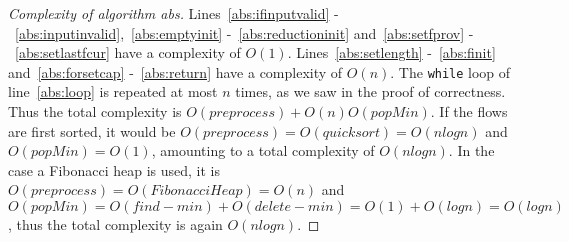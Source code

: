 \begin{proof}[Complexity of algorithm abs]
  Lines~\ref{abs:ifinputvalid} -~\ref{abs:inputinvalid},~\ref{abs:emptyinit} -~\ref{abs:reductioninit} and~\ref{abs:setfprov}
  -~\ref{abs:setlastfcur} have a complexity of $O(1)$. Lines~\ref{abs:setlength} -~\ref{abs:finit} and~\ref{abs:forsetcap}
  -~\ref{abs:return} have a complexity of $O(n)$. The \texttt{while} loop of line~\ref{abs:loop} is repeated at most $n$
  times, as we saw in the proof of correctness. Thus the total complexity is $O(preprocess) + O(n)O(popMin)$. If the flows
  are first sorted, it would be $O(preprocess) = O(quicksort) = O(nlogn)$ and $O(popMin) = O(1)$, amounting to a total
  complexity of $O(nlogn)$. In the case a Fibonacci heap is used, it is $O(preprocess) = O(FibonacciHeap) = O(n)$ and
  $O(popMin) = O(find-min) + O(delete-min) = O(1) + O(logn) = O(logn)$, thus the total complexity is again $O(nlogn)$.
\end{proof}
